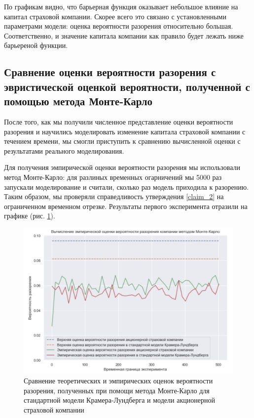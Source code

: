 \documentclass{article}
\theoremstyle{plain}
\theoremstyle{plain}
\theoremstyle{plain}
\theoremstyle{plain}
\theoremstyle{definition}
\theoremstyle{remark}
\begin{document}
По графикам видно, что барьерная функция оказывает небольшое влияние на капитал страховой компании. Скорее всего это связано с установленными параметрами модели: оценка вероятности разорения относительно большая. Соответственно, и значение капитала компании как правило будет лежать ниже барьереной функции.

\clearpage

\subsection{Сравнение оценки вероятности разорения с эвристической оценкой вероятности, полученной с помощью метода Монте-Карло}

После того, как мы получили численное представление оценки вероятности разорения и научились моделировать изменение капитала страховой компании с течением времени, мы смогли приступить к сравнению вычисленной оценки с результатами реального моделирования.

Для получения эмпирической оценки вероятности разорения мы использовали метод Монте-Карло: для разлиных временных огарничений мы 5000 раз запускали моделирование и считали, сколько раз модель приходила к разорению. Таким образом, мы проверяли справедливость утверждения \ref{claim_2} на ограниченном временном отрезке. Результаты первого эксперимента отразили на графике (рис. \ref{MC_1}).

\begin{figure}[h]
\centering
\includegraphics[scale=0.7]{images/KL_stock_MC_1.png}
\captionsetup{justification=centering}
\caption{Сравнение теоретических и эмпирических оценок вероятности разорения, полученных при помощи метода Монте-Карло для стандартной модели Крамера-Лундберга и модели акционерной страховой компании}
\label{MC_1}
\end{figure}
\end{document}

